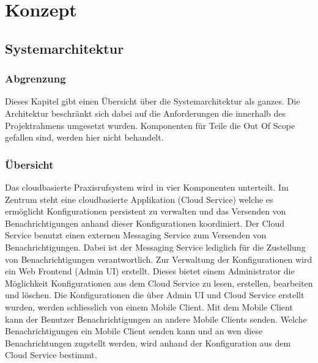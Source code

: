 \section{Konzept}\label{sec:konzept}
\subsection{Systemarchitektur}\label{subsec:systemarchitektur}
\subsubsection*{Abgrenzung}

Dieses Kapitel gibt einen Übersicht über die Systemarchitektur als ganzes. Die Architektur beschränkt sich dabei auf die
Anforderungen die innerhalb des Projektrahmens umgesetzt wurden. Komponenten für Teile die Out Of Scope gefallen sind,
werden hier nicht behandelt.

\subsubsection*{Übersicht}

Das cloudbasierte Praxisrufsystem wird in vier Komponenten unterteilt.
Im Zentrum steht eine cloudbasierte Applikation (Cloud Service) welche es ermöglicht Konfigurationen persistent zu verwalten und das Versenden von Benachrichtigungen anhand dieser Konfigurationen koordiniert.
Der Cloud Service benutzt einen externen Messaging Service zum Versenden von Benachrichtigungen. Dabei ist der Messaging Service lediglich für die Zustellung von Benachrichtigungen verantwortlich.
Zur Verwaltung der Konfigurationen wird ein Web Frontend (Admin UI) erstellt. Dieses bietet einem Administrator die Möglichkeit Konfigurationen aus dem Cloud Service zu lesen, erstellen, bearbeiten und löschen.
Die Konfigurationen die über Admin UI und Cloud Service erstellt wurden, werden schliesslich von einem Mobile Client. Mit dem Mobile Client kann der Benutzer Benachrichtigungen an andere Mobile Clients senden.
Welche Benachrichtigungen ein Mobile Client senden kann und an wen diese Benachrichtungen zugstellt werden, wird anhand der Konfiguration aus dem Cloud Service bestimmt.

